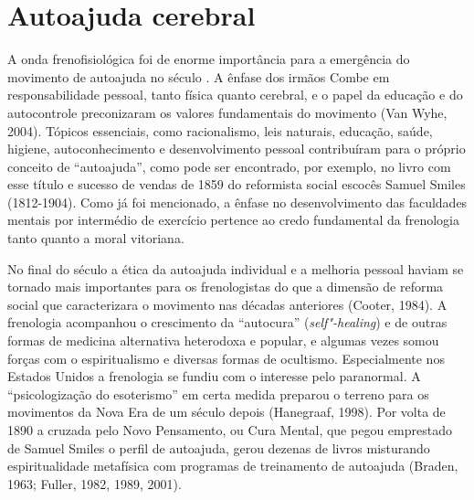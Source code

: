 \section{Autoajuda cerebral}

A onda frenofisiológica foi de enorme importância para a emergência do
movimento de autoajuda no século . A ênfase dos irmãos Combe em
responsabilidade pessoal, tanto física quanto cerebral, e o papel da
educação e do autocontrole preconizaram os valores fundamentais do
movimento (Van Wyhe, 2004). Tópicos essenciais, como racionalismo, leis
naturais, educação, saúde, higiene, autoconhecimento e desenvolvimento
pessoal contribuíram para o próprio conceito de ``autoajuda'', como pode
ser encontrado, por exemplo, no livro com esse título e sucesso de
vendas de 1859 do reformista social escocês Samuel Smiles (1812-1904).
Como já foi mencionado, a ênfase no desenvolvimento das faculdades
mentais por intermédio de exercício pertence ao credo fundamental da
frenologia tanto quanto a moral vitoriana.

No final do século  a ética da autoajuda individual e a melhoria
pessoal haviam se tornado mais importantes para os frenologistas do que
a dimensão de reforma social que caracterizara o movimento nas décadas
anteriores (Cooter, 1984). A frenologia acompanhou o crescimento da
``autocura'' (\emph{self"-healing}) e de outras formas de medicina
alternativa heterodoxa e popular, e algumas vezes somou forças com o
espiritualismo e diversas formas de ocultismo. Especialmente nos Estados
Unidos a frenologia se fundiu com o interesse pelo paranormal. A
``psicologização do esoterismo'' em certa medida preparou o terreno para
os movimentos da Nova Era de um século depois (Hanegraaf, 1998). Por
volta de 1890 a cruzada pelo Novo Pensamento, ou Cura Mental, que pegou
emprestado de Samuel Smiles o perfil de autoajuda, gerou dezenas de
livros misturando espiritualidade metafísica com programas de
treinamento de autoajuda (Braden, 1963; Fuller, 1982, 1989, 2001).

